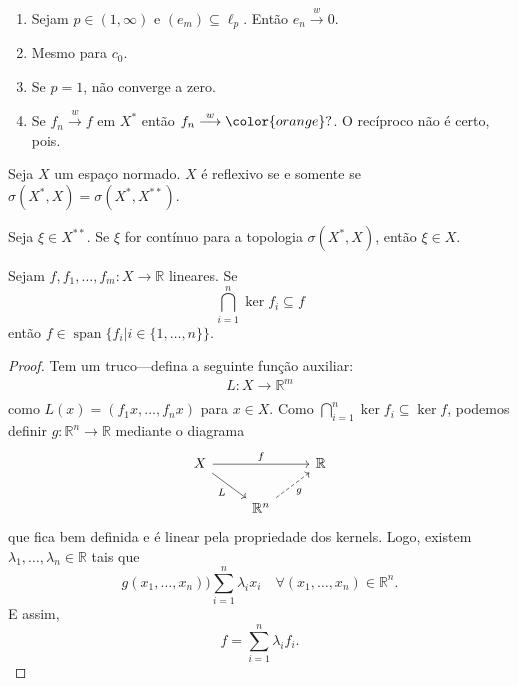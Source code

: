 \documentclass[portuguese]{article}
\theoremstyle{definition}
\newcommand{\R}{\mathbb{R}}
\begin{document}
	\begin{exemplo}\leavevmode
		\begin{enumerate}
			\item Sejam $p\in(1,\infty)$ e $(e_m)\subseteq\ell_p$. Então $e_n\overset{w}{\longrightarrow}0$.
			\item Mesmo para $c_0$.
			\item Se $p=1$, não converge a zero.
			\item Se $f_n\overset{w}{\longrightarrow}f$ em $X^*$ então $f_n\overset{w}{\longrightarrow}{\color{orange}?}$. O recíproco não é certo, pois. 
		\end{enumerate}
	\end{exemplo}
	\begin{teo}
		Seja $X$ um espaço normado. $X$ é reflexivo se e somente se $\sigma(X^*,X)=\sigma(X^*,X^{**})$.
	\end{teo}
	\begin{prop}
		Seja $\xi\in X^{**}$. Se $\xi$ for contínuo para a topologia $\sigma(X^*,X)$, então $\xi\in X$.
	\end{prop}
	\begin{lema}
		Sejam $f,f_1,\ldots,f_m:X\to\R$ lineares. Se
		\[\bigcap_{i=1}^n\ker f_i\subseteq f\]
		então $f\in\operatorname{span}\{f_i|i\in\{1,\ldots,n\}\}$.
	\end{lema}
	\begin{proof}
		Tem um truco---defina a seguinte função auxiliar:
		\begin{align*}
			L:X\to\R^m\\
		\end{align*}
		como $L(x)=(f_1x,\ldots,f_nx)$ para $x\in X$. Como $\bigcap_{i=1}^n\ker f_i\subseteq \ker f$, podemos definir $g:\R^n\to\R$ mediante o diagrama
		\[\begin{tikzcd}
			X\arrow[dr,swap,"L"]\arrow[rr,"f"]&&\R\\
			&\R^n\arrow[ur,dashed,"g",swap]
		\end{tikzcd}\]
		que fica bem definida e é linear pela propriedade dos kernels. Logo, existem $\lambda_1,\ldots,\lambda_n\in\R$ tais que
		\[g(x_1,\ldots,x_n))\sum_{i=1}^n\lambda_ix_i\quad\forall (x_1,\ldots,x_n)\in\R^n.\]
		E assim,
		\[f=\sum_{i=1}^n\lambda_if_i.\]
	\end{proof}
\end{document}
